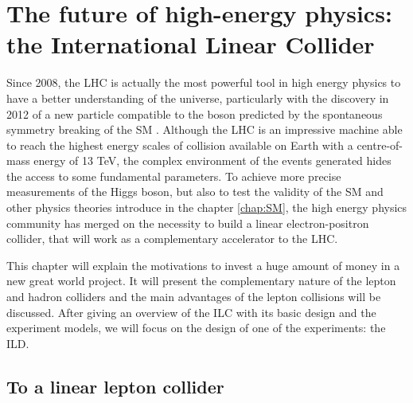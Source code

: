 \chapter[The ILC]{The future of high-energy physics: the International Linear Collider}
\label{chap:ILC}



  Since 2008, the \gls{LHC} is actually the most powerful tool in high energy physics to have a better understanding of the universe, particularly with the discovery in 2012 of a new particle compatible to the boson predicted by the spontaneous symmetry breaking of the SM \cite{Aad2012, Chatrchyan2012}.
  Although the \gls{LHC} is an impressive machine able to reach the highest energy scales of collision available on Earth with a centre-of-mass energy of 13 TeV, the complex environment of the events generated hides the access to some fundamental parameters. 
  To achieve more precise measurements of the Higgs boson, but also to test the validity of the SM and other physics theories introduce in the chapter \ref{chap:SM}, the high energy physics community has merged on the necessity to build a linear electron-positron collider, that will work as a complementary accelerator to the \gls{LHC}.
  
  This chapter will explain the motivations to invest a huge amount of money in a new great world project. 
  It will present the complementary nature of the lepton and hadron colliders and the main advantages of the lepton collisions will be discussed.
  After giving an overview of the ILC with its basic design and the experiment models, we will focus on the design of one of the experiments: the \gls{ILD}.

 \minitoc
  
  \section{To a linear lepton collider}
 
